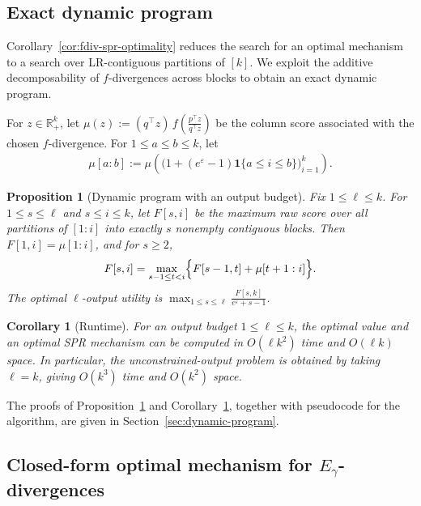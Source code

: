 \documentclass{article}
\theoremstyle{plain}
\newtheorem{corollary}[theorem]{Corollary}
\newtheorem{proposition}[theorem]{Proposition}
\theoremstyle{definition}
\theoremstyle{plain}
\begin{document}
\subsection{Exact dynamic program}
\label{sec:main-results-dp}

Corollary~\ref{cor:fdiv-spr-optimality} reduces the search for an optimal mechanism to a search over LR-contiguous partitions of $[k]$. We exploit the additive decomposability of $f$-divergences across blocks to obtain an exact dynamic program.

For $z\in\mathbb{R}_+^k$, let $\displaystyle \mu(z):=(q^\top z)\,f\!\left(\frac{p^\top z}{q^\top z}\right)$ be the column score associated with the chosen $f$-divergence. For $1\le a\le b\le k$, let
\begin{align}
    \mu[a:b]
    :=
    \mu\!\left(
        \bigl(1+(e^\varepsilon-1)\mathbf{1}\{a\le i\le b\}\bigr)_{i=1}^k
    \right).
\end{align}

\begin{proposition}[Dynamic program with an output budget]
\label{prop:dp-contiguous-partition}
Fix $1\le \ell\le k$. For $1\le s\le \ell$ and $s\le i\le k$, let $F[s,i]$ be the maximum raw score over all partitions of $[1:i]$ into exactly $s$ nonempty contiguous blocks. Then $F[1,i]=\mu[1:i]$, and for $s\ge 2$,
\begin{align}
    F[s,i]=\max_{s-1\le t<i}\Bigl\{F[s-1,t]+\mu[t+1:i]\Bigr\}.
\end{align}
The optimal $\ell$-output utility is $\displaystyle \max_{1\le s\le \ell}\frac{F[s,k]}{e^\varepsilon+s-1}$.
\end{proposition}

\begin{corollary}[Runtime]
\label{cor:dp-runtime}
For an output budget $1\le \ell\le k$, the optimal value and an optimal SPR mechanism can be computed in $O(\ell k^2)$ time and $O(\ell k)$ space. In particular, the unconstrained-output problem is obtained by taking $\ell=k$, giving $O(k^3)$ time and $O(k^2)$ space.
\end{corollary}

The proofs of Proposition~\ref{prop:dp-contiguous-partition} and Corollary~\ref{cor:dp-runtime}, together with pseudocode for the algorithm, are given in Section~\ref{sec:dynamic-program}.

\subsection{Closed-form optimal mechanism for \texorpdfstring{$E_\gamma$-divergences}{E-gamma-divergences}}
\label{sec:main-results-egamma}
\end{document}
